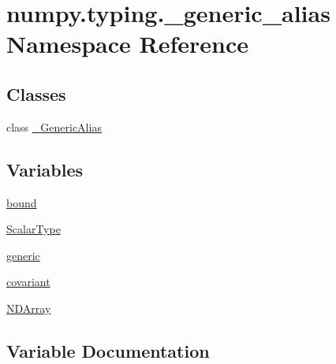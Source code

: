\hypertarget{namespacenumpy_1_1typing_1_1__generic__alias}{}\section{numpy.\+typing.\+\_\+generic\+\_\+alias Namespace Reference}
\label{namespacenumpy_1_1typing_1_1__generic__alias}
\subsection*{Classes}
\begin{DoxyCompactItemize}
\item 
class \hyperlink{classnumpy_1_1typing_1_1__generic__alias_1_1__GenericAlias}{\+\_\+\+Generic\+Alias}
\end{DoxyCompactItemize}
\subsection*{Variables}
\begin{DoxyCompactItemize}
\item 
\hyperlink{namespacenumpy_1_1typing_1_1__generic__alias_a2bb4d7b76f16a7019bd70ec528ac80e4}{bound}
\item 
\hyperlink{namespacenumpy_1_1typing_1_1__generic__alias_accf8d41be9286e7337dd824561a72a44}{Scalar\+Type}
\item 
\hyperlink{namespacenumpy_1_1typing_1_1__generic__alias_a8561f15e15e4333ac556d3947b7455b9}{generic}
\item 
\hyperlink{namespacenumpy_1_1typing_1_1__generic__alias_a16bcb8d7a0270df02a3aac5e1917a2fb}{covariant}
\item 
\hyperlink{namespacenumpy_1_1typing_1_1__generic__alias_a8fc6622bbdec4bcdf4fcf2dc3cead2db}{N\+D\+Array}
\end{DoxyCompactItemize}


\subsection{Variable Documentation}
\mbox{\label{namespacenumpy_1_1typing_1_1__generic__alias_a2bb4d7b76f16a7019bd70ec528ac80e4}} 

